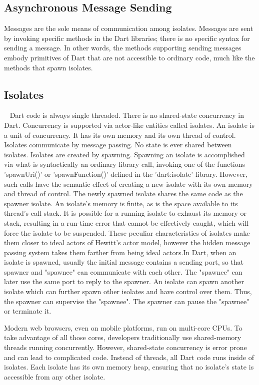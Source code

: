   \subsection{Asynchronous Message Sending}
  Messages are the sole means of communication among isolates. Messages are sent by invoking specific methods in the Dart libraries; there is no specific syntax for sending a message.
  In other words, the methods supporting sending messages embody primitives of Dart that are not accessible to ordinary code, much like the methods that spawn isolates.
  \subsection{Isolates}~\parencite{dartEcma}
  Dart code is always single threaded. There is no shared-state concurrency in Dart. Concurrency is supported via actor-like entities called isolates.
  An isolate is a unit of concurrency. It has its own memory and its own thread of control. Isolates communicate by message passing. No state is ever shared between isolates. Isolates are created by spawning.
  Spawning an isolate is accomplished via what is syntactically an ordinary library call, invoking one of the functions 'spawnUri()' or 'spawnFunction()' defined in the 'dart:isolate' library. However, such calls have the semantic effect of creating a new isolate with its own memory and thread of control.
  The newly spawned isolate shares the same code as the spawner isolate. \cite{dartApiIsolate}
  An isolate’s memory is finite, as is the space available to its thread’s call stack. It is possible for a running isolate to exhaust its memory or stack, resulting in a run-time error that cannot be effectively caught, which will force the isolate to be suspended.
  These peculiar characteristics of isolates make them closer to ideal actors of Hewitt’s actor model, however the hidden message passing system takes them farther from being ideal actors.In Dart, when an isolate is spawned, usually the initial message contains a sending port, so that spawner and "spawnee" can communicate with each other. The "spawnee" can later use the same port to reply to the spawner. An isolate can spawn another isolate which can further spawn other isolates and have control over them. Thus, the spawner can supervise the "spawnee". The spawner can pause the "spawnee" or terminate it.

  Modern web browsers, even on mobile platforms, run on multi-core CPUs. To take advantage of all those cores, developers traditionally use shared-memory threads running concurrently. However, shared-state concurrency is error prone and can lead to complicated code.
  Instead of threads, all Dart code runs inside of isolates. Each isolate has its own memory heap, ensuring that no isolate’s state is accessible from any other isolate. ~\parencite{laddWalrath}

